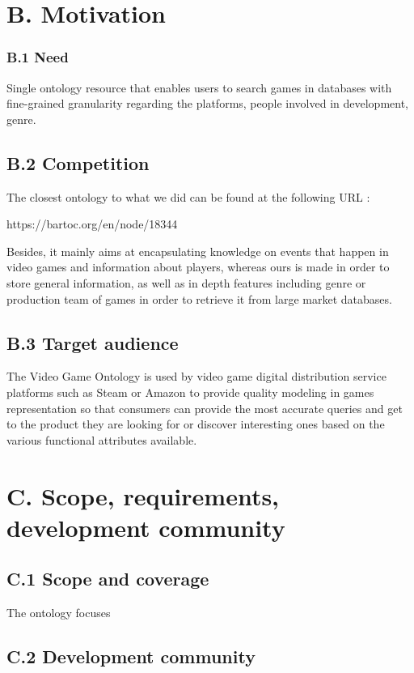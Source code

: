 \documentclass{article}
\begin{document}
\section*{B. Motivation}


\subsubsection*{B.1 Need}

Single ontology resource that enables users to search games in databases with fine-grained granularity regarding the platforms, people involved in development, genre.

\subsection*{B.2 Competition}

The closest ontology to what we did can be found at the following URL : 
 
https://bartoc.org/en/node/18344

Besides, it mainly aims at encapsulating knowledge on events that happen in video games and information about players, whereas ours is made in order to store general information, as well as in depth features including genre or production team of games in order to retrieve it from large market databases.

\subsection*{B.3 Target audience}

The Video Game Ontology is used by video game digital distribution service platforms such as Steam or Amazon to provide quality modeling in games representation so that consumers can provide the most accurate queries and get to the product they are looking for or discover interesting ones based on the various functional attributes available. 

\section*{C. Scope, requirements, development community}
\subsection*{C.1 Scope and coverage}
The ontology focuses 
\subsection*{C.2 Development community}
\end{document}
